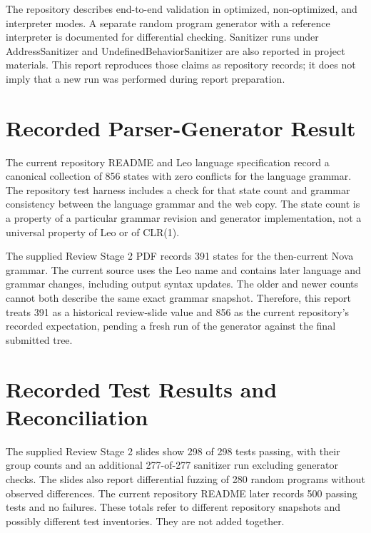 \documentclass[12pt,a4paper,oneside]{report}
\begin{document}
The repository describes end-to-end validation in optimized, non-optimized, and interpreter modes. A separate random program generator with a reference interpreter is documented for differential checking. Sanitizer runs under AddressSanitizer and UndefinedBehaviorSanitizer are also reported in project materials. This report reproduces those claims as repository records; it does not imply that a new run was performed during report preparation.

\section{Recorded Parser-Generator Result}
The current repository README and Leo language specification record a canonical collection of 856 states with zero conflicts for the language grammar. The repository test harness includes a check for that state count and grammar consistency between the language grammar and the web copy. The state count is a property of a particular grammar revision and generator implementation, not a universal property of Leo or of CLR(1).

The supplied Review Stage 2 PDF records 391 states for the then-current Nova grammar. The current source uses the Leo name and contains later language and grammar changes, including output syntax updates. The older and newer counts cannot both describe the same exact grammar snapshot. Therefore, this report treats 391 as a historical review-slide value and 856 as the current repository's recorded expectation, pending a fresh run of the generator against the final submitted tree.

\section{Recorded Test Results and Reconciliation}
The supplied Review Stage 2 slides show 298 of 298 tests passing, with their group counts and an additional 277-of-277 sanitizer run excluding generator checks. The slides also report differential fuzzing of 280 random programs without observed differences. The current repository README later records 500 passing tests and no failures. These totals refer to different repository snapshots and possibly different test inventories. They are not added together.
\end{document}
